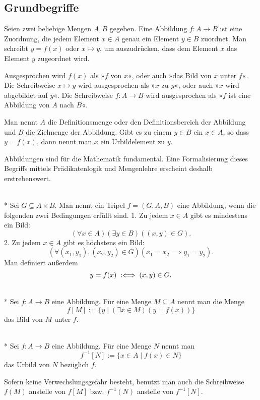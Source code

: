 \subsection{Grundbegriffe}
Seien zwei beliebige Mengen $A,B$ gegeben. Eine Abbildung
$f\colon A\to B$ ist eine Zuordnung, die jedem Element $x\in A$
genau ein Element $y\in B$ zuordnet. Man schreibt $y=f(x)$
oder $x\mapsto y$, um auszudrücken, dass dem Element $x$
das Element $y$ zugeordnet wird.

Ausgesprochen wird $f(x)$ als »$f$ von $x$«, oder auch
»das Bild von $x$ unter $f$«. Die Schreibweise $x\mapsto y$
wird ausgesprochen als »$x$ zu $y$«, oder auch
»$x$ wird abgebildet auf $y$«. Die Schreibweise
$f\colon A\to B$ wird ausgesprochen als »$f$ ist eine
Abbildung von $A$ nach $B$«.

Man nennt $A$ die Definitionsmenge oder den Definitionsbereich
der Abbildung und $B$ die Zielmenge der Abbildung. Gibt es zu
einem $y\in B$ ein $x\in A$, so dass $y=f(x)$, dann nennt man
$x$ ein Urbildelement zu $y$.

Abbildungen sind für die Mathematik fundamental. Eine
Formalisierung dieses Begriffs mittels Prädikatenlogik
und Mengenlehre erscheint deshalb erstrebenswert.

\begin{Definition}[Abbildung]\mbox{}\\*
Sei $G\subseteq A\times B$. Man nennt ein Tripel $f=(G,A,B)$ eine
Abbildung, wenn die folgenden zwei Bedingungen erfüllt sind.
1. Zu jedem $x\in A$ gibt es mindestens ein Bild:
\[(\forall x\in A)(\exists y\in B)((x,y)\in G).\]
2. Zu jedem $x\in A$ gibt es höchstens ein Bild:
\[(\forall (x_1,y_1),(x_2,y_2)\in G)(x_1=x_2\implies y_1=y_2).\]
Man definiert außerdem
\[y=f(x)\;:\Longleftrightarrow\; (x,y)\in G.\]
\end{Definition}

\begin{Definition}[Bildmenge]\label{def:img}\mbox{}\\*
Sei $f\colon A\to B$ eine Abbildung.
Für eine Menge $M\subseteq A$ nennt man die Menge
\[f[M] := \{y\mid(\exists x\in M)(y=f(x))\}\]
das Bild von $M$ unter $f$.
\end{Definition}

\begin{Definition}[Urbildmenge]\mbox{}\\*
Sei $f\colon A\to B$ eine Abbildung. Für eine Menge $N$ nennt man
\[f^{-1}[N] := \{x\in A\mid f(x)\in N\}\]
das Urbild von $N$ bezüglich $f$.
\end{Definition}
Sofern keine Verwechslungsgefahr besteht, benutzt man auch die
Schreibweise $f(M)$ anstelle von $f[M]$ bzw. $f^{-1}(N)$ anstelle
von $f^{-1}[N]$.

